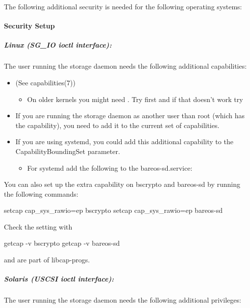 The following additional security is needed for the following operating systems:

\paragraph{Security Setup}

\subparagraph{Linux (SG\_IO ioctl interface):} The user running the storage daemon needs the following additional capabilities:

\begin{itemize}
 \item {} (See capabilities(7))
 \begin{itemize}
  \item On older kernels you might need . Try  first and if that doesn't work try 
 \end{itemize}
 \item If you are running the storage daemon as another user than root (which has the  capability), you need to add it to the current set of capabilities.
 \item If you are using systemd, you could add this additional capability to the CapabilityBoundingSet parameter.
 \begin{itemize}
  \item For systemd add the following to the bareos-sd.service: 
 \end{itemize}
\end{itemize}

You can also set up the extra capability on bscrypto and bareos-sd by running the following commands:

\begin{commands}{}
setcap cap_sys_rawio=ep bscrypto
setcap cap_sys_rawio=ep bareos-sd
\end{commands}

Check the setting with

\begin{commands}{}
getcap -v bscrypto
getcap -v bareos-sd
\end{commands}

 and  are part of libcap-progs.\\

\subparagraph{Solaris (USCSI ioctl interface):} The user running the storage daemon needs the following additional privileges:

